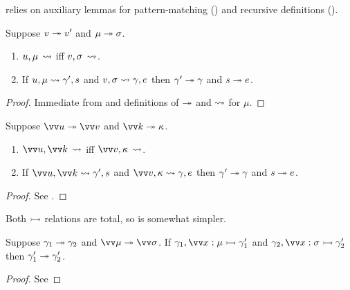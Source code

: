  relies on auxiliary lemmas for pattern-matching () and recursive
definitions ().

\begin{lemma}
   \label{lem:match-eq}
   Suppose $v \twoheadrightarrow v'$ and $\mu \twoheadrightarrow \sigma$.
   \hfill
   \begin{enumerate}
      \item $u, \mu\,\rightsquigarrow$ iff $v,\sigma\,\rightsquigarrow$.
      \item If $u, \mu \rightsquigarrow \gamma', s$ and $v, \sigma \rightsquigarrow \gamma, e$ then $\gamma' \twoheadrightarrow \gamma$ and $s \twoheadrightarrow e$.
   \end{enumerate}
\end{lemma}
\begin{proof}
   Immediate from  and definitions of $\twoheadrightarrow$ and $\rightsquigarrow$ for $\mu$.
\end{proof}

\begin{lemma}
   \label{lem:match-seq-eq}
   Suppose $\seq{u} \desugar \seq{v}$ and $\seq{k} \desugar \kappa$.
   \hfill
   \begin{enumerate}
      \item $\seq{u}, \seq{k}\,\match$ iff $\seq{v},\kappa\,\match$.
      \item If $\seq{u}, \seq{k} \match \gamma', s$ and $\seq{v}, \kappa \match \gamma, e$ then $\gamma' \twoheadrightarrow \gamma$ and $s \twoheadrightarrow e$.
   \end{enumerate}
\end{lemma}
\begin{proof}
   See .
\end{proof}

Both $\rightarrowtail$ relations are total, so  is somewhat simpler.

\begin{lemma}
   \label{lem:closedefs-eq}
   Suppose $\gamma_1 \twoheadrightarrow \gamma_2$ and $\seq{\mu} \desugar \seq{\sigma}$. If $\gamma_1, \seq{\bind{x}{\mu}} \closeDefs \gamma_1'$ and $\gamma_2, \seq{\bind{x}{\sigma}} \closeDefs \gamma_2'$ then $\gamma_1' \twoheadrightarrow \gamma_2'$.
\end{lemma}
\begin{proof}
   See 
\end{proof}

